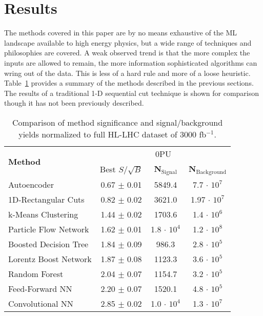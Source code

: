 \section{Results}
\label{sec:results}

The methods covered in this paper are by no means exhaustive of the ML landscape available to high energy physics, but a wide range of techniques and philosophies are covered. A weak observed trend is that the more complex the inputs are allowed to remain, the more information sophisticated algorithms can wring out of the data. This is less of a hard rule and more of a loose heuristic. Table~\ref{tab:summary} provides a summary of the methods described in the previous sections. The results of a traditional 1-D sequential cut technique is shown for comparison though it has not been previously described. 

\begin{table}[h!]
\label{tab:summary}
  \begin{center}
  \begin{tabular}{|l|c|c|c|} %
      \hline\hline
      \multirow{2}{*}{\textbf{Method}} & \multicolumn{3}{c|}{0PU} \\
      \cline{2-4}
      & Best $S/\sqrt{B}$ & \textbf{N$_{\mathrm{Signal}}$} & \textbf{N$_{\mathrm{Background}}$} \\
      \hline
      Autoencoder           & 0.67 $\pm$ 0.01 & 5849.4 & 7.7 $\cdot$ $10^7$ \\
      1D-Rectangular Cuts   & 0.82 $\pm$ 0.02 & 3621.0 & 1.97 $\cdot$ $10^7$ \\
      k-Means Clustering    & 1.44 $\pm$ 0.02 & 1703.6 & 1.4 $\cdot$ $10^6$ \\
      Particle Flow Network & 1.62 $\pm$ 0.01 & 1.8 $\cdot$ $10^4$ & 1.2 $\cdot$ $10^8$ \\
      Boosted Decision Tree & 1.84 $\pm$ 0.09 & 986.3  & 2.8 $\cdot$ $10^5$ \\
      Lorentz Boost Network & 1.87 $\pm$ 0.08 & 1123.3 & 3.6 $\cdot$ $10^5$ \\
      Random Forest         & 2.04 $\pm$ 0.07 & 1154.7 & 3.2 $\cdot$ $10^5$ \\
      Feed-Forward NN       & 2.20 $\pm$ 0.07 & 1520.1 & 4.8 $\cdot$ $10^5$ \\
      Convolutional NN      & 2.85 $\pm$ 0.02 & 1.0 $\cdot$ $10^4$ & 1.3 $\cdot$ $10^7$ \\
      \hline\hline
    \end{tabular}
    \caption{Comparison of method significance and signal/background yields normalized to full HL-LHC dataset of 3000 fb$^{-1}$.}
  \end{center}
\end{table}

